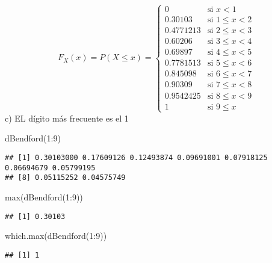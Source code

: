 \documentclass[
]{article}
\newenvironment{Shaded}{\begin{snugshade}}{\end{snugshade}}
\newcommand{\DecValTok}[1]{\textcolor[rgb]{0.00,0.00,0.81}{#1}}
\newcommand{\FunctionTok}[1]{\textcolor[rgb]{0.00,0.00,0.00}{#1}}
\newcommand{\NormalTok}[1]{#1}
\newcommand{\SpecialCharTok}[1]{\textcolor[rgb]{0.00,0.00,0.00}{#1}}
\begin{document}
\[
F_X(x)=P(X\leq x)=\left\{
\begin{array}{ll}
0 & \mbox{si } x<1\\
0.30103 & \mbox{si } 1\leq x < 2\\
0.4771213 & \mbox{si } 2\leq x < 3\\
0.60206 & \mbox{si } 3\leq x < 4\\
0.69897 & \mbox{si } 4\leq x < 5\\
0.7781513 & \mbox{si } 5\leq x < 6\\
0.845098 & \mbox{si } 6\leq x < 7\\
0.90309 & \mbox{si } 7\leq x < 8\\
0.9542425 & \mbox{si } 8\leq x < 9\\
1  & \mbox{si } 9\leq x
\end{array}
\right.
\] c) EL dígito más frecuente es el 1

\begin{Shaded}
\begin{Highlighting}[]
\FunctionTok{dBendford}\NormalTok{(}\DecValTok{1}\SpecialCharTok{:}\DecValTok{9}\NormalTok{)}
\end{Highlighting}
\end{Shaded}

\begin{verbatim}
## [1] 0.30103000 0.17609126 0.12493874 0.09691001 0.07918125 0.06694679 0.05799195
## [8] 0.05115252 0.04575749
\end{verbatim}

\begin{Shaded}
\begin{Highlighting}[]
\FunctionTok{max}\NormalTok{(}\FunctionTok{dBendford}\NormalTok{(}\DecValTok{1}\SpecialCharTok{:}\DecValTok{9}\NormalTok{))}
\end{Highlighting}
\end{Shaded}

\begin{verbatim}
## [1] 0.30103
\end{verbatim}

\begin{Shaded}
\begin{Highlighting}[]
\FunctionTok{which.max}\NormalTok{(}\FunctionTok{dBendford}\NormalTok{(}\DecValTok{1}\SpecialCharTok{:}\DecValTok{9}\NormalTok{))}
\end{Highlighting}
\end{Shaded}

\begin{verbatim}
## [1] 1
\end{verbatim}
\end{document}

